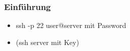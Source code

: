 \begin{frame}
\frametitle{Einführung}
\begin{itemize}
\item ssh -p 22 user@server mit Password
\item (ssh server mit Key)
\end{itemize}
\end{frame}